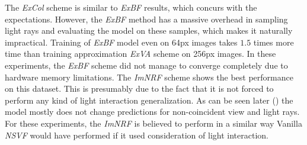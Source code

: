The \textit{ExCol} scheme is similar to \textit{ExBF} results,
which concurs with the expectations.
However, the \textit{ExBF} method has a massive overhead in sampling light rays
and evaluating the model on these samples,
which makes it naturally impractical.
Training of \textit{ExBF} model even on 64px images takes $1.5$ times more time
than training approximation \textit{ExVA} scheme on 256px images.
In these experiments, the \textit{ExBF} scheme did not manage
to converge completely due to hardware memory limitations.
The \textit{ImNRF} scheme shows the best performance on this dataset.
This is presumably due to the fact that it is not forced
to perform any kind of light interaction generalization.
As can be seen later () the model
mostly does not change predictions for non-coincident view and light rays.
For these experiments, the \textit{ImNRF} is believed to perform
in a similar way Vanilla \textit{NSVF} would have performed if it used consideration of light interaction.






